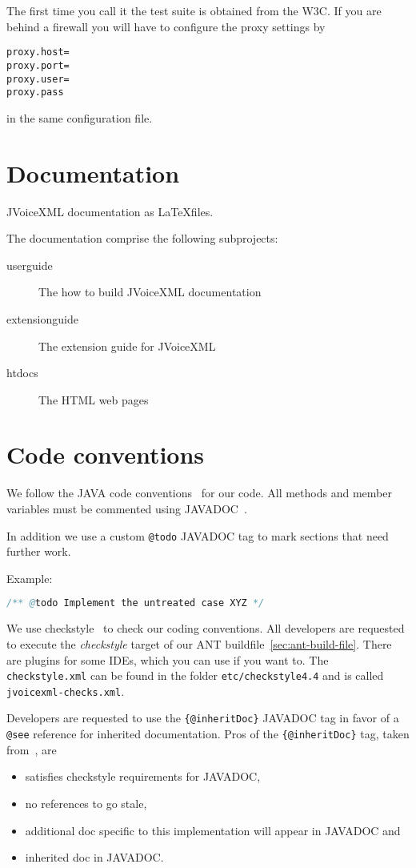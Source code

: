 \documentclass[11pt,a4paper]{article}
\begin{document}
The first time you call it the test suite is obtained from the W3C. If you are
behind a firewall you will have to configure the proxy settings by
\begin{lstlisting}
proxy.host=
proxy.port=
proxy.user=
proxy.pass
\end{lstlisting}
in the same configuration file.

\section{Documentation}

JVoiceXML documentation as \LaTeX files.

The documentation comprise the following subprojects:

\begin{description}
\item[userguide] The how to build JVoiceXML documentation
\item[extensionguide] The extension guide for JVoiceXML
\item[htdocs] The HTML web pages
\end{description}

\section{Code conventions}
\label{sec:code-conventions}

We follow the JAVA code conventions~\cite{sun:codeconv} for our code. All
methods and member variables must be commented using 
JAVADOC~\cite{sun:javadoc_guidelines}.

In addition we use a custom \texttt{@todo} JAVADOC tag to mark
sections that need further work.

Example:

\begin{lstlisting}[language=Java]
/** @todo Implement the untreated case XYZ */
\end{lstlisting}

We use checkstyle~\cite{checkstyle} to check our coding conventions.
All developers are requested to execute the \emph{checkstyle} target
of our ANT buildfile~\ref{sec:ant-build-file}. 
There are plugins for some IDEs, which you can use if you want to. The
\texttt{checkstyle.xml} can be found in the folder 
\texttt{etc/checkstyle4.4} and is called \texttt{jvoicexml-checks.xml}.

Developers are requested to use the \texttt{\{@inheritDoc\}} JAVADOC
tag in favor of a \texttt{@see} reference for inherited documentation.
Pros of the \texttt{\{@inhe\-rit\-Doc\}} tag, taken 
from~\cite{tauber:inheritdoc}, are
\begin{itemize}
\item satisfies checkstyle requirements for JAVADOC,
\item no references to go stale,
\item additional doc specific to this implementation will appear in JAVADOC and
\item inherited doc in JAVADOC.
\end{itemize}
\end{document}
